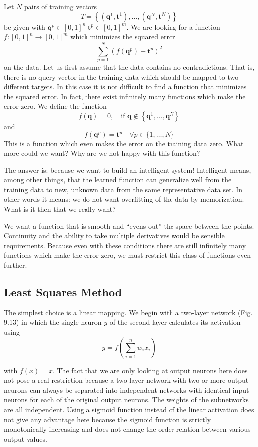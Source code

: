\documentclass[10pt]{book}
\begin{document}
Let $N$ pairs of training vectors
\[
T=\left\{\left(\boldsymbol{q}^{1}, \boldsymbol{t}^{1}\right), \ldots,\left(\boldsymbol{q}^{N}, \boldsymbol{t}^{N}\right)\right\}
\]
be given with $\boldsymbol{q}^{p} \in [0,1]^{n}$ $\boldsymbol{t}^{p} \in [0,1]^{m}$. We are looking for a function $f:[0,1]^{n} \rightarrow [0,1]^{m}$ which minimizes the squared error
\[
\sum_{p=1}^{N}\left(f\left(\boldsymbol{q}^{p}\right)-\boldsymbol{t}^{p}\right)^{2}
\]
on the data. Let us first assume that the data contains no contradictions. That is, there is no query vector in the training data which should be mapped to two different targets. In this case it is not difficult to find a function that minimizes the squared error. In fact, there exist infinitely many functions which make the error zero. We define the function
\[
f(\boldsymbol{q})=0, \quad \text{if } \boldsymbol{q} \notin\left\{\boldsymbol{q}^{1}, \ldots, \boldsymbol{q}^{N}\right\}
\]
and
\[
f\left(\boldsymbol{q}^{p}\right)=\boldsymbol{t}^{p} \quad \forall p \in\{1, \ldots, N\}
\]
This is a function which even makes the error on the training data zero. What more could we want? Why are we not happy with this function?

The answer is: because we want to build an intelligent system! Intelligent means, among other things, that the learned function can generalize well from the training data to new, unknown data from the same representative data set. In other words it means: we do not want overfitting of the data by memorization. What is it then that we really want?

We want a function that is smooth and ``evens out'' the space between the points. Continuity and the ability to take multiple derivatives would be sensible requirements. Because even with these conditions there are still infinitely many functions which make the error zero, we must restrict this class of functions even further.

\subsection{Least Squares Method}
The simplest choice is a linear mapping. We begin with a two-layer network (Fig. 9.13) in which the single neuron $y$ of the second layer calculates its activation using
$$
y=f\left(\sum_{i=1}^{n} w_{i} x_{i}\right)
$$

with $f(x)=x$. The fact that we are only looking at output neurons here does not pose a real restriction because a two-layer network with two or more output neurons can always be separated into independent networks with identical input neurons for each of the original output neurons. The weights of the subnetworks are all independent. Using a sigmoid function instead of the linear activation does not give any advantage here because the sigmoid function is strictly monotonically increasing and does not change the order relation between various output values.
\end{document}
